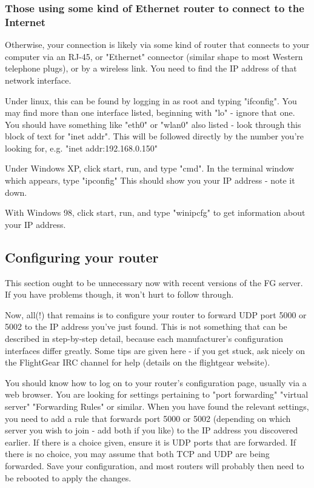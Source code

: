 \subsubsection{Those using some kind of Ethernet router to connect to the Internet}

Otherwise, your connection is likely via some kind of router that connects to your computer via an RJ-45, or "Ethernet" connector (similar shape to most Western telephone plugs), or by a wireless link. You need to find the IP address of that network interface.

Under linux, this can be found by logging in as root and typing "ifconfig". You may find more than one interface listed, beginning with "lo" - ignore that one. You should have something like "eth0" or "wlan0" also listed - look through this block of text for "inet addr". This will be followed directly by the number you're looking for, e.g. "inet addr:192.168.0.150"

Under Windows XP, click start, run, and type "cmd". In the terminal window which appears, type "ipconfig" This should show you your IP address - note it down.

With Windows 98, click start, run, and type "winipcfg" to get information about your IP address.

\subsection{Configuring your router}

This section ought to be unnecessary now with recent versions of the FG server.  If you have problems though, it won't hurt to follow through.

Now, all(!) that remains is to configure your router to forward UDP port 5000 or 5002 to the IP address you've just found. This is not something that can be described in step-by-step detail, because each manufacturer's configuration interfaces differ greatly. Some tips are given here - if you get stuck, ask nicely on the FlightGear IRC channel for help (details on the flightgear website).

You should know how to log on to your router's configuration page, usually via a web browser. You are looking for settings pertaining to "port forwarding" "virtual server" "Forwarding Rules" or similar. When you have found the relevant settings, you need to add a rule that forwards port 5000 or 5002 (depending on which server you wish to join - add both if you like) to the IP address you discovered earlier. If there is a choice given, ensure it is UDP ports that are forwarded. If there is no choice, you may assume that both TCP and UDP are being forwarded. Save your configuration, and most routers will probably then need to be rebooted to apply the changes.

